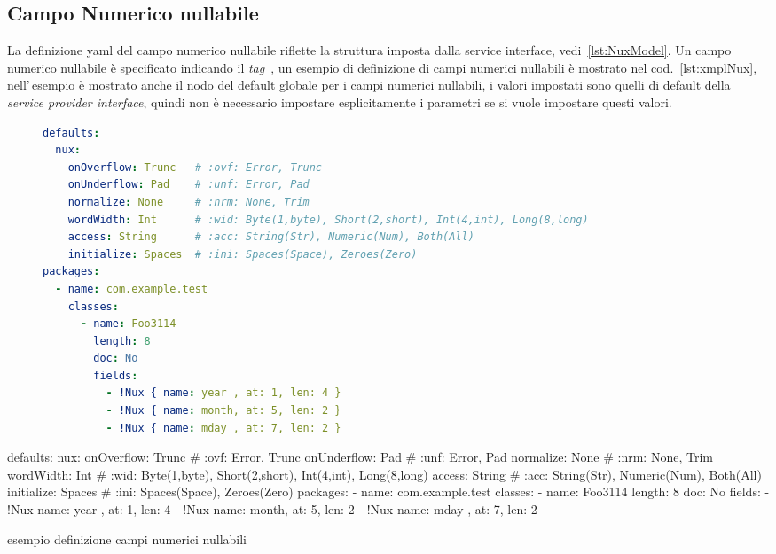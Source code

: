\subsection{Campo Numerico nullabile} \label{sub:yaml.nux}
La definizione yaml del campo numerico nullabile riflette la struttura imposta 
dalla service interface, vedi~\ref{lst:NuxModel}.
Un campo numerico nullabile è specificato indicando il \textsl{tag} 
\,, 
un esempio di definizione di campi numerici nullabili è mostrato nel 
cod.~\ref{lst:xmplNux}, nell'\,esempio è mostrato anche il nodo del default
globale per i campi numerici nullabili, i valori impostati sono quelli di 
default della \textsl{service provider interface}, quindi non è necessario 
impostare esplicitamente i parametri se si vuole impostare questi valori.


\ifesource
\begin{figure*}[!htb]
\begin{lstlisting}[language=yaml, 
caption={esempio definizione campi numerici nullabili}, 
label=lst:xmplNux]
defaults:
  nux:
    onOverflow: Trunc   # :ovf: Error, Trunc
    onUnderflow: Pad    # :unf: Error, Pad
    normalize: None     # :nrm: None, Trim
    wordWidth: Int      # :wid: Byte(1,byte), Short(2,short), Int(4,int), Long(8,long)
    access: String      # :acc: String(Str), Numeric(Num), Both(All)
    initialize: Spaces  # :ini: Spaces(Space), Zeroes(Zero)
packages:
  - name: com.example.test
    classes:
      - name: Foo3114
        length: 8
        doc: No
        fields:
          - !Nux { name: year , at: 1, len: 4 }
          - !Nux { name: month, at: 5, len: 2 }
          - !Nux { name: mday , at: 7, len: 2 }
\end{lstlisting}
\end{figure*}
\else
\begin{elisting}[!htb]
\begin{yamlcode}
defaults:
  nux:
    onOverflow: Trunc   # :ovf: Error, Trunc
    onUnderflow: Pad    # :unf: Error, Pad
    normalize: None     # :nrm: None, Trim
    wordWidth: Int      # :wid: Byte(1,byte), Short(2,short), Int(4,int), Long(8,long)
    access: String      # :acc: String(Str), Numeric(Num), Both(All)
    initialize: Spaces  # :ini: Spaces(Space), Zeroes(Zero)
packages:
  - name: com.example.test
    classes:
      - name: Foo3114
        length: 8
        doc: No
        fields:
          - !Nux { name: year , at: 1, len: 4 }
          - !Nux { name: month, at: 5, len: 2 }
          - !Nux { name: mday , at: 7, len: 2 }
\end{yamlcode}
\caption{esempio definizione campi numerici nullabili}
\label{lst:xmplNux}
\end{elisting}
\fi

